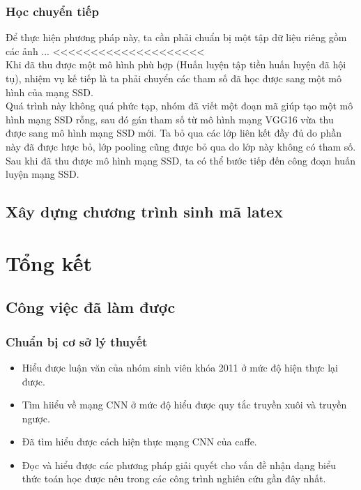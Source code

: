 \documentclass[a4paper,12pt]{article}
\begin{document}
	\subsubsection*{Học chuyển tiếp}
	
	Để thực hiện phương pháp này, ta cần phải chuẩn bị một tập dữ liệu riêng gồm các ảnh ... <<<<<<<<<<<<<<<<<<<<\\
	
	Khi đã thu được một mô hình phù hợp (Huấn luyện tập tiền huấn luyện đã hội tụ), nhiệm vụ kế tiếp là ta phải chuyển các tham số đã học được sang một mô hình của mạng SSD.\\
	
	Quá trình này không quá phức tạp, nhóm đã viết một đoạn mã giúp tạo một mô hình mạng SSD rỗng, sau đó gán tham số từ mô hình mạng VGG16 vừa thu được sang mô hình mạng SSD mới. Ta bỏ qua các lớp liên kết đầy đủ do phần này đã được lược bỏ, lớp pooling cũng được bỏ qua do lớp này không có tham số. \\
	
	Sau khi đã thu được mô hình mạng SSD, ta có thể bước tiếp đến công đoạn huấn luyện mạng SSD.
	
	\subsection{Xây dựng chương trình sinh mã latex}
	
	
	\section{Tổng kết}
	\subsection{Công việc đã làm được}
	\subsubsection{Chuẩn bị cơ sở lý thuyết}
	
	\begin{itemize}
		\item Hiểu được luận văn của nhóm sinh viên khóa 2011 ở mức độ hiện thực lại được.
		\item Tìm hiiểu về mạng CNN ở mức độ hiểu được quy tắc truyền xuôi và truyền ngược.
		\item Đã tìm hiểu được cách hiện thực mạng CNN của caffe.
		\item Đọc và hiểu được các phương pháp giải quyết cho vấn đề nhận dạng biểu thức toán học được nêu trong các công trình nghiên cứu gần đây nhất.
		
	\end{itemize} 
	
\end{document}
